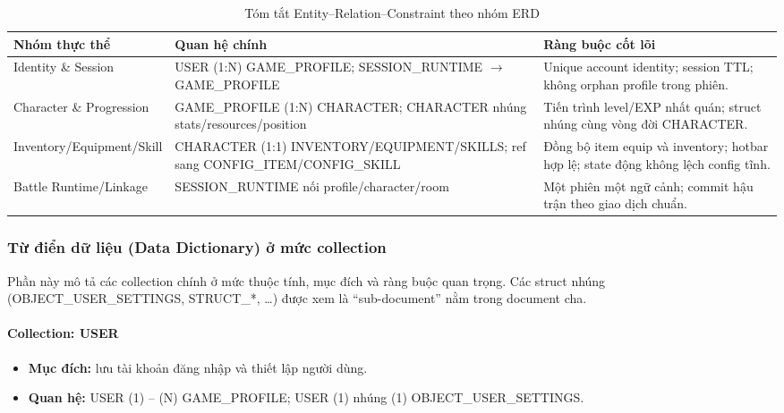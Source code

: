 \begin{table}[H]
\centering
\renewcommand{\arraystretch}{1.2}
\setlength{\tabcolsep}{4pt}
\begin{tabularx}{\textwidth}{|L{4.0cm}|L{3.8cm}|Y|}
\hline
\textbf{Nhóm thực thể} & \textbf{Quan hệ chính} & \textbf{Ràng buộc cốt lõi} \\
\hline
Identity \& Session & USER (1:N) GAME\_PROFILE; SESSION\_\allowbreak RUNTIME $\rightarrow$ GAME\_PROFILE & Unique account identity; session TTL; không orphan profile trong phiên. \\
\hline
Character \& Progression & GAME\_PROFILE (1:N) CHARACTER; CHARACTER nhúng stats/\allowbreak resources/\allowbreak position & Tiến trình level/\allowbreak EXP nhất quán; struct nhúng cùng vòng đời CHARACTER. \\
\hline
Inventory/\allowbreak Equipment/\allowbreak Skill & CHARACTER (1:1) INVENTORY/\allowbreak EQUIPMENT/\allowbreak SKILLS; ref sang CONFIG\_ITEM/\allowbreak CONFIG\_SKILL & Đồng bộ item equip và inventory; hotbar hợp lệ; state động không lệch config tĩnh. \\
\hline
Battle Runtime/\allowbreak Linkage & SESSION\_\allowbreak RUNTIME nối profile/\allowbreak character/\allowbreak room & Một phiên một ngữ cảnh; commit hậu trận theo giao dịch chuẩn. \\
\hline
\end{tabularx}
\caption{Tóm tắt Entity--Relation--Constraint theo nhóm ERD}
\label{tab:erd-erc-summary}
\end{table}

\subsubsection{Từ điển dữ liệu (Data Dictionary) ở mức collection}
\label{subsubsec:design-data-dictionary}

Phần này mô tả các collection chính ở mức thuộc tính, mục đích và ràng buộc quan trọng. Các struct nhúng (OBJECT\_\allowbreak USER\_\allowbreak SETTINGS, STRUCT\_*, \ldots) được xem là ``sub-document'' nằm trong document cha.

\renewcommand{\arraystretch}{1.15}
\setlength{\LTpre}{0pt}
\setlength{\LTpost}{0pt}
\setlength{\tabcolsep}{4pt}

\paragraph{Collection: USER}
\begin{itemize}
    \item \textbf{Mục đích:} lưu tài khoản đăng nhập và thiết lập người dùng.
    \item \textbf{Quan hệ:} USER (1) -- (N) GAME\_PROFILE; USER (1) nhúng (1) OBJECT\_\allowbreak USER\_\allowbreak SETTINGS.
\end{itemize}


